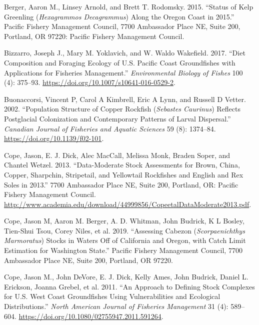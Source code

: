 \documentclass[11pt,
  english,
  a4paper,
]{article}
\begin{document}
\leavevmode\tagmcend\tagstructend


\hypertarget{refs}{}
\begin{cslreferences}
\leavevmode\hypertarget{ref-berger_status_2015}{}%
Berger, Aaron M., Linsey Arnold, and Brett T. Rodomsky. 2015. ``Status of Kelp Greenling (\emph{Hexagrammos Decagrammus}) Along the Oregon Coast in 2015.'' Pacific Fishery Management Council, 7700 Ambassador Place NE, Suite 200, Portland, OR 97220: Pacific Fishery Management Council.

\leavevmode\hypertarget{ref-bizzarro_diet_2017-1}{}%
Bizzarro, Joseph J., Mary M. Yoklavich, and W. Waldo Wakefield. 2017. ``Diet Composition and Foraging Ecology of U.S. Pacific Coast Groundfishes with Applications for Fisheries Management.'' \emph{Environmental Biology of Fishes} 100 (4): 375--93. \url{https://doi.org/10.1007/s10641-016-0529-2}.

\leavevmode\hypertarget{ref-buonaccorsi_population_2002}{}%
Buonaccorsi, Vincent P, Carol A Kimbrell, Eric A Lynn, and Russell D Vetter. 2002. ``Population Structure of Copper Rockfish (\emph{Sebastes Caurinus}) Reflects Postglacial Colonization and Contemporary Patterns of Larval Dispersal.'' \emph{Canadian Journal of Fisheries and Aquatic Sciences} 59 (8): 1374--84. \url{https://doi.org/10.1139/f02-101}.

\leavevmode\hypertarget{ref-cope_data-moderate_2013}{}%
Cope, Jason, E. J. Dick, Alec MacCall, Melissa Monk, Braden Soper, and Chantel Wetzel. 2013. ``Data-Moderate Stock Assessments for Brown, China, Copper, Sharpchin, Stripetail, and Yellowtail Rockfishes and English and Rex Soles in 2013.'' 7700 Ambassador Place NE, Suite 200, Portland, OR: Pacific Fishery Management Council. \url{http://www.academia.edu/download/44999856/CopeetalDataModerate2013.pdf}.

\leavevmode\hypertarget{ref-cope_assessing_2019}{}%
Cope, Jason M, Aaron M. Berger, A. D. Whitman, John Budrick, K L Bosley, Tien-Shui Tsou, Corey Niles, et al. 2019. ``Assessing Cabezon (\emph{Scorpaenichthys Marmoratus}) Stocks in Waters Off of California and Oregon, with Catch Limit Estimation for Washington State.'' Pacific Fishery Management Council, 7700 Ambassador Place NE, Suite 200, Portland, OR 97220.

\leavevmode\hypertarget{ref-cope_approach_2011}{}%
Cope, Jason M., John DeVore, E. J. Dick, Kelly Ames, John Budrick, Daniel L. Erickson, Joanna Grebel, et al. 2011. ``An Approach to Defining Stock Complexes for U.S. West Coast Groundfishes Using Vulnerabilities and Ecological Distributions.'' \emph{North American Journal of Fisheries Management} 31 (4): 589--604. \url{https://doi.org/10.1080/02755947.2011.591264}.


\end{cslreferences}
\end{document}
